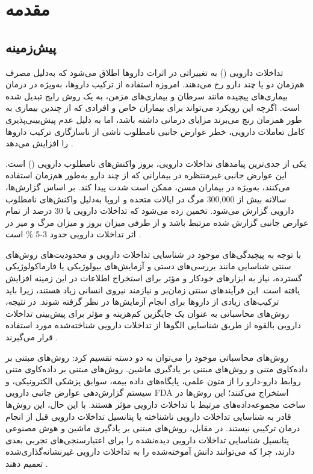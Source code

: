 \chapter{مقدمه}

\section{پیش‌زمینه}

تداخلات دارویی () به تغییراتی در اثرات داروها اطلاق می‌شود که به‌دلیل مصرف هم‌زمان دو یا چند دارو رخ می‌دهند. امروزه استفاده از ترکیب داروها، به‌ویژه در درمان بیماری‌های پیچیده مانند سرطان و بیماری‌های مزمن، به یک روش رایج تبدیل شده است. اگرچه این رویکرد می‌تواند برای بیماران خاص و افرادی که از چندین بیماری به طور همزمان رنج می‌برند مزایای درمانی داشته باشد، اما به دلیل عدم پیش‌بینی‌پذیری کامل تعاملات دارویی، خطر عوارض جانبی نامطلوب ناشی از ناسازگاری ترکیب داروها را افزایش می‌دهد \cite{ref_li2023}.

یکی از جدی‌ترین پیامدهای تداخلات دارویی، بروز واکنش‌های نامطلوب دارویی () است. این عوارض جانبی غیرمنتظره در بیمارانی که از چند دارو به‌طور هم‌زمان استفاده می‌کنند، به‌ویژه در بیماران مسن، ممکن است شدت پیدا کند. بر اساس گزارش‌ها، سالانه بیش از 300,000 مرگ در ایالات متحده و اروپا به‌دلیل واکنش‌های نامطلوب دارویی گزارش می‌شود. تخمین زده می‌شود که تداخلات دارویی با 30 درصد از تمام عوارض جانبی گزارش شده مرتبط باشد \cite{ref_nyamabo2021} و از طرفی میزان بروز و میزان مرگ و میر در اثر تداخلات دارویی حدود 3-5 \% است \cite{ref_he2023}.

با توجه به پیچیدگی‌های موجود در شناسایی تداخلات دارویی و محدودیت‌های روش‌های سنتی شناسایی مانند بررسی‌های دستی و آزمایش‌های بیولوژیکی یا فارماکولوژیکی گسترده، نیاز به ابزارهای خودکار و مؤثر برای استخراج اطلاعات در این زمینه افزایش یافته است. این فرآیندهای سنتی زمان‌بر و نیازمند نیروی انسانی زیاد هستند، زیرا باید ترکیب‌های زیادی از داروها برای انجام آزمایش‌ها در نظر گرفته شوند. در نتیجه، روش‌های محاسباتی به عنوان یک جایگزین کم‌هزینه و مؤثر برای پیش‌بینی تداخلات دارویی بالقوه از طریق شناسایی الگوها از تداخلات دارویی شناخته‌شده مورد استفاده قرار می‌گیرند \cite{ref_yang2022}.

روش‌های محاسباتی موجود را می‌توان به دو دسته تقسیم کرد: روش‌های مبتنی بر داده‌کاوی متنی و روش‌های مبتنی بر یادگیری ماشین. روش‌های مبتنی بر داده‌کاوی متنی روابط دارو-دارو را از متون علمی، پایگاه‌های داده بیمه، سوابق پزشکی الکترونیکی، و سیستم گزارش‌دهی عوارض جانبی دارویی FDA استخراج می‌کنند؛ این روش‌ها در ساخت مجموعه‌داده‌های مرتبط با تداخلات دارویی مؤثر هستند. با این حال، این روش‌ها قادر به شناسایی تداخلات دارویی ناشناخته یا پتانسیل تداخلات دارویی قبل از انجام درمان ترکیبی نیستند. در مقابل، روش‌های مبتنی بر یادگیری ماشین و هوش مصنوعی پتانسیل شناسایی تداخلات دارویی دیده‌نشده را برای اعتبارسنجی‌های تجربی بعدی دارند، چرا که می‌توانند دانش آموخته‌شده را به تداخلات دارویی غیرنشانه‌گذاری‌شده تعمیم دهند \cite{ref_yang2022, ref_wang2024}.

